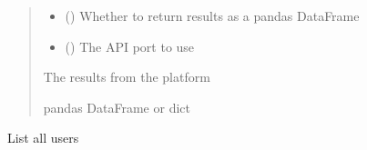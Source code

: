 \documentclass[letterpaper,10pt,english]{sphinxmanual}
\begin{document}
\begin{fulllineitems}
\begin{fulllineitems}
\begin{quote}
\begin{description}
\begin{itemize}
\item {} 
\sphinxAtStartPar
{} (\sphinxstyleliteralemphasis{\sphinxupquote{ (}}\sphinxstyleliteralemphasis{\sphinxupquote{)}}) \textendash{} Whether to return results as a pandas DataFrame

\item {} 
\sphinxAtStartPar
{} (\sphinxstyleliteralemphasis{\sphinxupquote{ (}}\sphinxstyleliteralemphasis{\sphinxupquote{)}}) \textendash{} The API port to use

\end{itemize}

\sphinxAtStartPar
{} \textendash{} The results from the platform

\sphinxAtStartPar
pandas DataFrame or dict

\end{description}\end{quote}

\end{fulllineitems}


\begin{fulllineitems}
\label{\detokenize{aisquared.platform:aisquared.platform.AISquaredPlatformClient.AISquaredPlatformClient.list_users}}
\pysigstartsignatures
{}
\pysigstopsignatures
\sphinxAtStartPar
List all users


\end{fulllineitems}
\end{fulllineitems}
\end{document}
